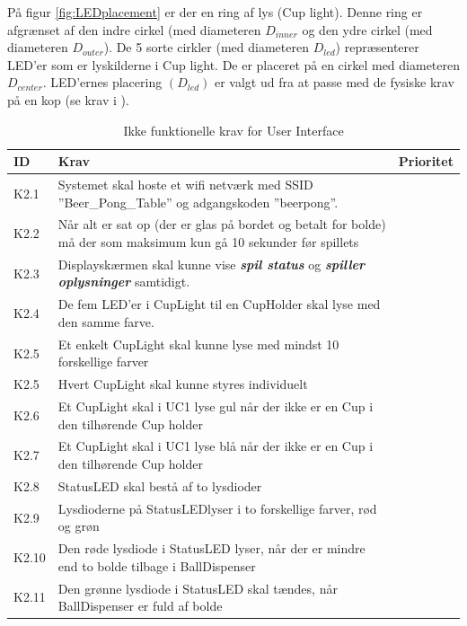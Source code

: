 \documentclass[Kravspecifikation/Kravspec_Main.tex]{subfiles}
\begin{document}
På figur \ref{fig:LEDplacement} er der en ring af lys (Cup light). Denne ring er afgrænset af den indre cirkel (med diameteren $D_{inner}$ og den ydre cirkel (med diameteren $D_{outer}$). De 5 sorte cirkler (med diameteren $D_{led}$) repræsenterer LED'er som er lyskilderne i Cup light. De er placeret på en cirkel med diameteren $D_{center}$. LED'ernes placering $(D_{led})$ er valgt ud fra at passe med de fysiske krav på en kop (se krav i ).
\begin{table}[H]
\centering
\begin{tabular}{|L{0.1\textwidth}|L{0.65\textwidth}|L{0.15\textwidth}|}
\hline
\textbf{ID} & \textbf{Krav} & \textbf{Prioritet} \\ \hline
K2.1 & Systemet skal hoste et wifi netværk med SSID ''Beer\_Pong\_Table'' og adgangskoden ''beerpong''. & \\ \hline
K2.2 & Når alt er sat op (der er glas på bordet og betalt for bolde) må der som maksimum kun gå 10 sekunder før spillets &  \\ \hline
K2.3 & Displayskærmen skal kunne vise \textit{\textbf{spil status}} og \textit{\textbf{spiller oplysninger}} samtidigt. & \\ \hline
K2.4 & De fem LED'er i CupLight til en CupHolder skal lyse med den samme farve. & \\ \hline
K2.5 & Et enkelt CupLight skal kunne lyse med mindst 10 forskellige farver & \\ \hline
K2.5 & Hvert CupLight skal kunne styres individuelt & \\ \hline 
K2.6 & Et CupLight skal i UC1 lyse gul når der ikke er en Cup i den tilhørende Cup holder  & \\ \hline
K2.7 & Et CupLight skal i UC1 lyse blå når der ikke er en Cup i den tilhørende Cup holder & \\ \hline
K2.8 & StatusLED skal bestå af to lysdioder &  \\ \hline
K2.9 & Lysdioderne på StatusLEDlyser i to forskellige farver, rød og grøn &  \\ \hline
K2.10 & Den røde lysdiode i StatusLED lyser, når der er mindre end to bolde tilbage i BallDispenser &  \\ \hline
K2.11 & Den grønne lysdiode i StatusLED skal tændes, når BallDispenser er fuld af bolde &  \\ \hline
\end{tabular}
\caption{Ikke funktionelle krav for User Interface}
\label{tab:user_interface}
\end{table}
\end{document}
